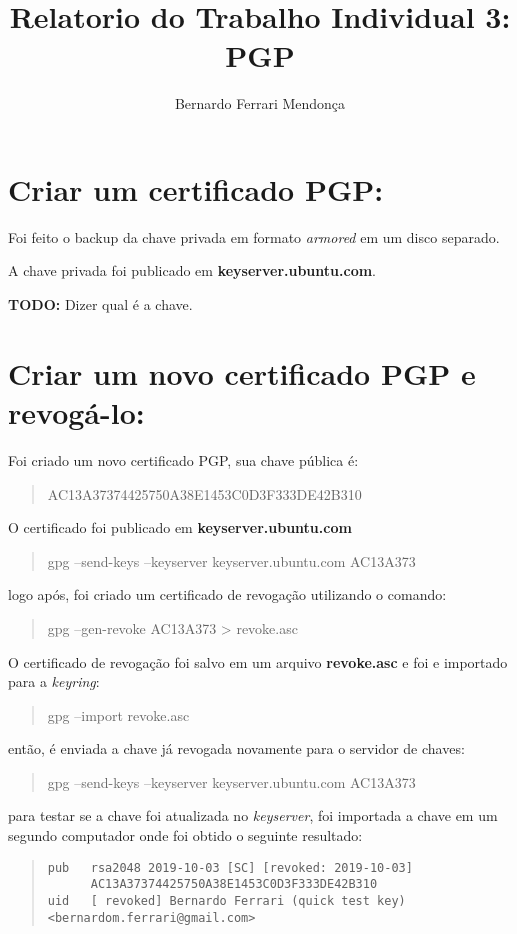 \documentclass[12pt, letterpaper]{article}
\title{Relatorio do Trabalho Individual 3: PGP}
\author{Bernardo Ferrari Mendonça}
\begin{document}
\maketitle

\section{Criar um certificado PGP:}

Foi feito o backup da chave privada em formato \textit{armored} em um disco separado.

A chave privada foi publicado em \textbf{keyserver.ubuntu.com}.

\textbf{TODO:} Dizer qual é a chave.

\section{Criar um novo certificado PGP e revogá-lo:}

Foi criado um novo certificado PGP, sua chave pública é:

\begin{quote}
  AC13A37374425750A38E1453C0D3F333DE42B310
\end{quote}

O certificado foi publicado em \textbf{keyserver.ubuntu.com}
\begin{quote}
  gpg --send-keys --keyserver keyserver.ubuntu.com AC13A373
\end{quote}
logo após, foi criado um certificado de revogação utilizando o comando:

\begin{quote}
  gpg --gen-revoke AC13A373 \textgreater{} revoke.asc
\end{quote}

O certificado de revogação foi salvo em um arquivo \textbf{revoke.asc}
e foi e importado para a \textit{keyring}:
\begin{quote}
  gpg --import revoke.asc
\end{quote}
então, é enviada a chave já revogada novamente para o servidor de chaves:
\begin{quote}
  gpg --send-keys --keyserver keyserver.ubuntu.com AC13A373
\end{quote}
para testar se a chave foi atualizada no \textit{keyserver},
foi importada a chave em um segundo computador onde foi obtido o seguinte resultado:

\begin{quote}
\begin{verbatim}
pub   rsa2048 2019-10-03 [SC] [revoked: 2019-10-03]
      AC13A37374425750A38E1453C0D3F333DE42B310
uid   [ revoked] Bernardo Ferrari (quick test key)
<bernardom.ferrari@gmail.com>
\end{verbatim}
\end{quote}
\end{document}
